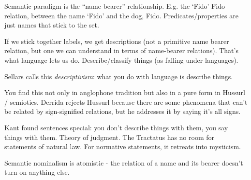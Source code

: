 Semantic paradigm is the ``name-bearer'' relationship. E.g. the `Fido'-Fido relation, between the name `Fido' and the dog, Fido. Predicates/properties are just names that stick to the set.

If we stick together labels, we get descriptions (not a primitive name bearer relation, but one we can understand in terms of name-bearer relations). That's what language lets us do. Describe/classify things (as falling under languages).

Sellars calls this \emph{descriptivism}: what you do with language is describe things.

You find this not only in anglophone tradition but also in a pure form in Hussurl / semiotics. Derrida rejects Hussurl because there are some phenomena that can't be related by sign-signified relations, but he addresses it by saying it's all signs.

Kant found sentences special: you don't describe things with them, you say things with them. Theory of judgment. The Tractatus has no room for statements of natural law. For normative statements, it retreats into mysticism.

Semantic nominalism is atomistic - the relation of a name and its bearer doesn't turn on anything else.

